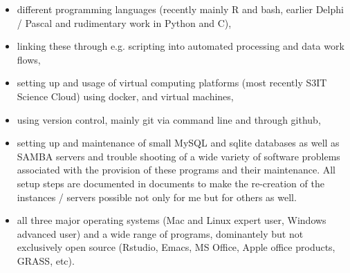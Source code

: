 \documentclass[a4paper]{article}
\begin{document}
\begin{itemize}[leftmargin=1.1in]

\item different programming languages (recently mainly R and bash,
	earlier Delphi / Pascal and rudimentary work in Python and C),

\item linking these through e.g. scripting into automated processing
	and data work flows,

\item setting up and usage of virtual computing platforms (most
	recently S3IT Science Cloud) using docker, and virtual machines,

\item using version control, mainly git via command line and through github,

\item setting up and maintenance of small MySQL and sqlite databases as
	well as SAMBA servers and trouble shooting of a wide variety of
	software problems associated with the provision of these programs and
	their maintenance. All setup steps are documented in documents to
	make the re-creation of the instances / servers possible not only for
	me but for others as well.

\item all three major operating systems (Mac and Linux expert
	user, Windows advanced user) and a wide range of programs,
	dominantely but not exclusively open source (Rstudio, Emacs, MS
	Office, Apple office products, GRASS, etc).

\end{itemize}
    

    

    



\end{document}
